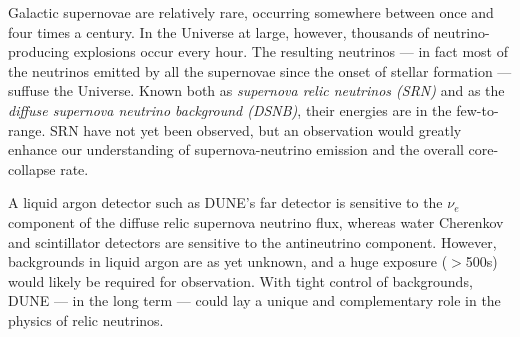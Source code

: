 Galactic supernovae are relatively rare, occurring somewhere between
once and four times a century. In the Universe
at large, however, thousands of neutrino-producing explosions occur
every hour.  The resulting neutrinos --- in fact most of the neutrinos
emitted by all the supernovae since the onset of stellar formation ---
suffuse the Universe.  Known both as \emph{supernova relic neutrinos
  (SRN)} and as the \emph{diffuse supernova neutrino background
  (DSNB)}, their energies are in the few-to- range.  SRN
have not yet been observed, but an observation would greatly enhance
our understanding of supernova-neutrino emission and the overall
core-collapse rate.


A liquid argon detector such as DUNE's far detector is sensitive to
the $\nu_e$ component of the diffuse relic supernova neutrino flux,
whereas water Cherenkov and scintillator detectors are sensitive to
the antineutrino component.  However, backgrounds in liquid argon are as
yet unknown, and a huge exposure ($>$\SI{500}{\ktyr}s)
would likely be required for observation.  
With tight control of
backgrounds, %
DUNE --- in the long term --- could %
lay a unique and
 complementary role in the physics of relic neutrinos.

%


